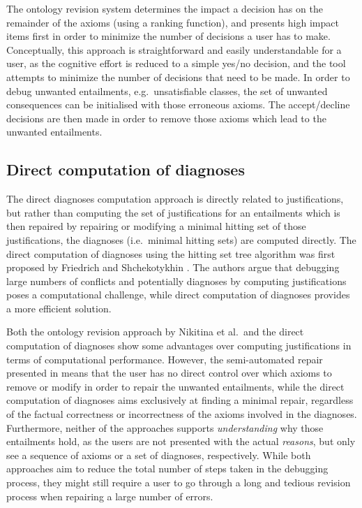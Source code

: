 The ontology revision system determines the impact a decision has on the remainder of the axioms (using a ranking function), and presents high impact items first in order to minimize the number of decisions a user has to make. Conceptually, this approach is straightforward and easily understandable for a user, as the cognitive effort is reduced to a simple yes/no decision, and the tool attempts to minimize the number of decisions that need to be made. In order to debug unwanted entailments, e.g.\ unsatisfiable classes, the set of unwanted consequences can be initialised with those erroneous axioms. The accept/decline decisions are then made in order to remove those axioms which lead to the unwanted entailments. 

\subsection{Direct computation of diagnoses}

The direct diagnoses computation approach \cite{friedrich05rg,du08eo,shchekotykhin12aa,rodler12aa} is directly related to justifications, but rather than computing the set of justifications for an entailments which is then repaired by repairing or modifying a minimal hitting set of those justifications, the diagnoses (i.e.\ minimal hitting sets) are computed directly. The direct computation of diagnoses using the hitting set tree algorithm was first proposed by Friedrich and Shchekotykhin \cite{friedrich05rg}. The authors argue that debugging large numbers of conflicts and potentially diagnoses by computing justifications poses a computational challenge, while direct computation of diagnoses provides a more efficient solution. 

Both the ontology revision approach by Nikitina et al.\ and the direct computation of diagnoses show some advantages over computing justifications in terms of computational performance. However, the semi-automated repair presented in \cite{nikitina12aa} means that the user has no direct control over which axioms to remove or modify in order to repair the unwanted entailments, while the direct computation of diagnoses aims exclusively at finding a minimal repair, regardless of the factual correctness or incorrectness of the axioms involved in the diagnoses. Furthermore, neither of the approaches supports \emph{understanding} why those entailments hold, as the users are not presented with the actual \emph{reasons}, but only see a sequence of axioms or a set of diagnoses, respectively. While both approaches aim to reduce the total number of steps taken in the debugging process, they might still require a user to go through a long and tedious revision process when repairing a large number of errors.

